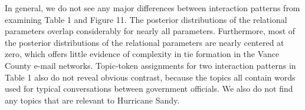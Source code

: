 \documentclass[a4paper]{article}
\begin{document}
          In general, we do not see any major differences between interaction patterns from examining Table 1 and Figure 11. The posterior distributions of the relational parameters overlap considerably for nearly all parameters. Furthermore, most of the posterior distributions of the relational parameters are nearly centered at zero, which offers little evidence of complexity in tie formation in the Vance County e-mail networks. Topic-token assignments for two interaction patterns in Table 1 also do not reveal obvious contrast, because the topics all contain words used for typical conversations between government officials. We also do not find any topics that are relevant to Hurricane Sandy.
               \begin{table}[ht]
               	\centering
\end{table}
\end{document}
